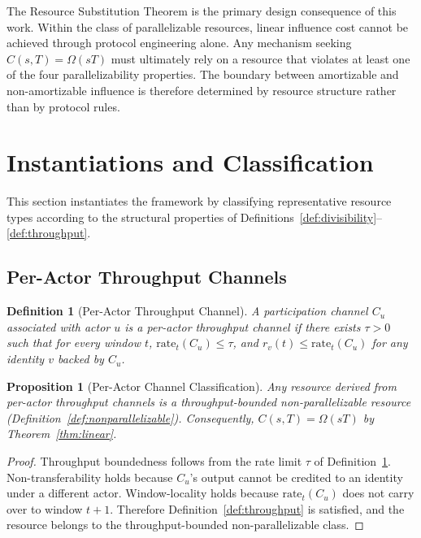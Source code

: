 \documentclass[manuscript,review]{acmart}
\newtheorem{proposition}[theorem]{Proposition}
\newtheorem{definition}[theorem]{Definition}
\theoremstyle{remark}
\begin{document}
	The Resource Substitution Theorem is the primary
	design consequence of this work.
	Within the class of parallelizable resources, linear
	influence cost cannot be achieved through protocol
	engineering alone.
	Any mechanism seeking $C(s,T) = \Omega(sT)$ must
	ultimately rely on a resource that violates at least
	one of the four parallelizability properties.
	The boundary between amortizable and non-amortizable
	influence is therefore determined by resource
	structure rather than by protocol rules.
	
	\section{Instantiations and Classification}
	\label{sec:instantiations}
	
	This section instantiates the framework by classifying
	representative resource types according to the
	structural properties of
	Definitions~\ref{def:divisibility}--\ref{def:throughput}.
	
	\subsection{Per-Actor Throughput Channels}
	\label{ssec:channels}
	
	\begin{definition}[Per-Actor Throughput Channel]
		\label{def:channel}
		A participation channel $C_u$ associated with
		actor $u$ is a \emph{per-actor throughput channel}
		if there exists $\tau > 0$ such that for every
		window $t$, $\mathrm{rate}_t(C_u) \leq \tau$, and
		$r_v(t) \leq \mathrm{rate}_t(C_u)$ for any identity
		$v$ backed by $C_u$.
	\end{definition}
	
	\begin{proposition}[Per-Actor Channel Classification]
		\label{prop:channel}
		Any resource derived from per-actor throughput
		channels is a throughput-bounded non-parallelizable
		resource (Definition~\ref{def:nonparallelizable}).
		Consequently, $C(s,T) = \Omega(sT)$ by
		Theorem~\ref{thm:linear}.
	\end{proposition}
	
	\begin{proof}
		Throughput boundedness follows from the rate limit
		$\tau$ of Definition~\ref{def:channel}.
		Non-transferability holds because $C_u$'s output
		cannot be credited to an identity under a different
		actor.
		Window-locality holds because $\mathrm{rate}_t(C_u)$
		does not carry over to window $t+1$.
		Therefore Definition~\ref{def:throughput} is
		satisfied, and the resource belongs to the
		throughput-bounded non-parallelizable class.
	\end{proof}
	
\end{document}
